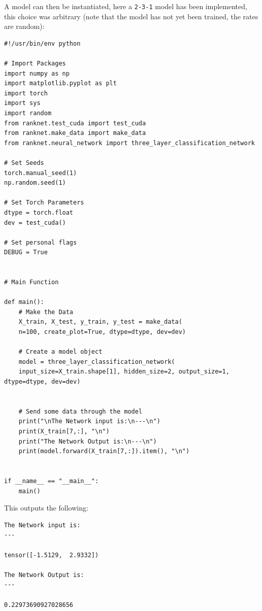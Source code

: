 \documentclass[a4paper,11pt,twoside]{article}
\begin{document}
A model can then be instantiated, here a \texttt{2-3-1}
model has been implemented, this choice was arbitrary (note that
the model has not yet been trained, the rates are random):

\begin{verbatim}
#!/usr/bin/env python

# Import Packages
import numpy as np
import matplotlib.pyplot as plt
import torch
import sys
import random
from ranknet.test_cuda import test_cuda
from ranknet.make_data import make_data
from ranknet.neural_network import three_layer_classification_network

# Set Seeds
torch.manual_seed(1)
np.random.seed(1)

# Set Torch Parameters
dtype = torch.float
dev = test_cuda()

# Set personal flags
DEBUG = True


# Main Function

def main():
    # Make the Data
    X_train, X_test, y_train, y_test = make_data(
	n=100, create_plot=True, dtype=dtype, dev=dev)

    # Create a model object
    model = three_layer_classification_network(
	input_size=X_train.shape[1], hidden_size=2, output_size=1, dtype=dtype, dev=dev)


    # Send some data through the model
    print("\nThe Network input is:\n---\n")
    print(X_train[7,:], "\n")
    print("The Network Output is:\n---\n")
    print(model.forward(X_train[7,:]).item(), "\n")


if __name__ == "__main__":
    main()

\end{verbatim}

This outputs the following:

\begin{verbatim}
The Network input is:
---

tensor([-1.5129,  2.9332]) 

The Network Output is:
---

0.22973690927028656 
\end{verbatim}
\end{document}
